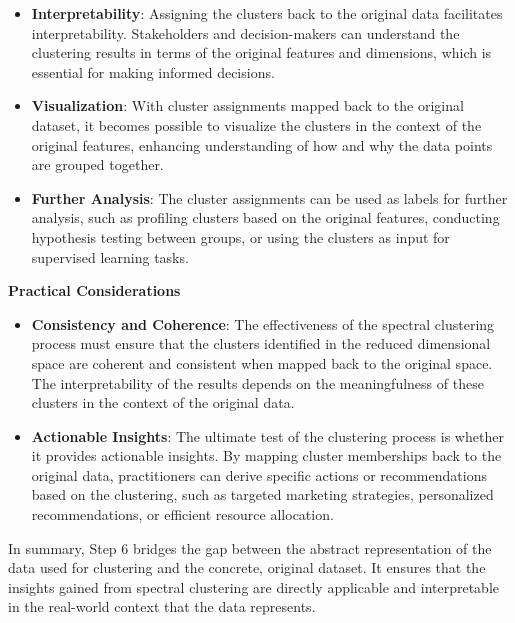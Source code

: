 \documentclass[11pt]{article}
\begin{document}
\begin{itemize}
\item
  \textbf{Interpretability}: Assigning the clusters back to the original
  data facilitates interpretability. Stakeholders and decision-makers
  can understand the clustering results in terms of the original
  features and dimensions, which is essential for making informed
  decisions.
\item
  \textbf{Visualization}: With cluster assignments mapped back to the
  original dataset, it becomes possible to visualize the clusters in the
  context of the original features, enhancing understanding of how and
  why the data points are grouped together.
\item
  \textbf{Further Analysis}: The cluster assignments can be used as
  labels for further analysis, such as profiling clusters based on the
  original features, conducting hypothesis testing between groups, or
  using the clusters as input for supervised learning tasks.
\end{itemize}

\textbf{Practical Considerations}

\begin{itemize}
\item
  \textbf{Consistency and Coherence}: The effectiveness of the spectral
  clustering process must ensure that the clusters identified in the
  reduced dimensional space are coherent and consistent when mapped back
  to the original space. The interpretability of the results depends on
  the meaningfulness of these clusters in the context of the original
  data.
\item
  \textbf{Actionable Insights}: The ultimate test of the clustering
  process is whether it provides actionable insights. By mapping cluster
  memberships back to the original data, practitioners can derive
  specific actions or recommendations based on the clustering, such as
  targeted marketing strategies, personalized recommendations, or
  efficient resource allocation.
\end{itemize}

In summary, Step 6 bridges the gap between the abstract representation
of the data used for clustering and the concrete, original dataset. It
ensures that the insights gained from spectral clustering are directly
applicable and interpretable in the real-world context that the data
represents.
\end{document}
